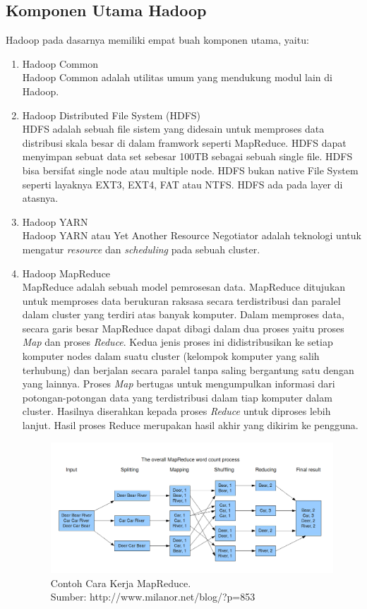 \subsection{Komponen Utama Hadoop}
\label{sec:komponen_utama_hadoop}
Hadoop pada dasarnya memiliki empat buah komponen utama, yaitu:
\begin{enumerate}
	\item Hadoop Common\\
	Hadoop Common adalah utilitas umum yang mendukung modul lain di Hadoop.
	\item Hadoop Distributed File System (HDFS)\\
	HDFS adalah sebuah file sistem yang didesain untuk memproses data distribusi skala besar di dalam framwork seperti MapReduce. HDFS dapat menyimpan sebuat data set sebesar 100TB sebagai sebuah single file.\cite{Lam:2010:HA:1965594} HDFS bisa bersifat single node atau multiple node. HDFS bukan native File System seperti layaknya EXT3, EXT4, FAT atau NTFS. HDFS ada pada layer di atasnya.
	
	\item Hadoop YARN\\
	Hadoop YARN atau Yet Another Resource Negotiator adalah teknologi untuk mengatur \textit{resource} dan \textit{scheduling} pada sebuah cluster.
	\item Hadoop MapReduce\\
	MapReduce adalah sebuah model pemrosesan data\cite{Lam:2010:HA:1965594}. MapReduce ditujukan untuk memproses data berukuran raksasa secara terdistribusi dan paralel dalam cluster yang terdiri atas banyak komputer. Dalam memproses data, secara garis besar MapReduce dapat dibagi dalam dua proses yaitu proses \textit{Map} dan proses \textit{Reduce}. Kedua jenis proses ini didistribusikan ke setiap komputer nodes dalam suatu cluster (kelompok komputer yang salih terhubung) dan berjalan secara paralel tanpa saling bergantung satu dengan yang lainnya. Proses \textit{Map} bertugas untuk mengumpulkan informasi dari potongan-potongan data yang terdistribusi dalam tiap komputer dalam cluster. Hasilnya diserahkan kepada proses \textit{Reduce} untuk diproses lebih lanjut. Hasil proses Reduce merupakan hasil akhir yang dikirim ke pengguna. \cite{Dean:2008:MSD:1327452.1327492}
	
	\begin{figure}
		\centering
		\includegraphics[scale=0.4]{Gambar/MapReduce_Work_Structure.png}
		\caption[Contoh Cara Kerja MapReduce]{Contoh Cara Kerja MapReduce. \\Sumber: http://www.milanor.net/blog/?p=853}
	\end{figure}
	

\end{enumerate}
